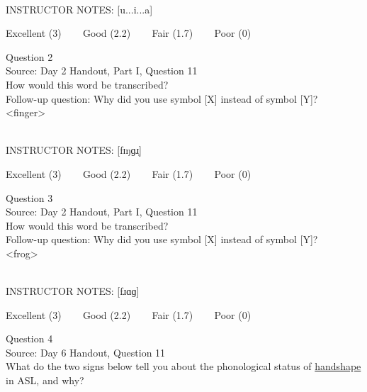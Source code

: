 \documentclass[12pt]{article}
\begin{document}
~\\
INSTRUCTOR NOTES: [u...i...a]


\vfill
Excellent (3) ~~~ Good (2.2) ~~~ Fair (1.7) ~~~ Poor (0)
\newpage

{\large Question 2}\\

Source: Day 2 Handout, Part I, Question 11\\

How would this word be transcribed?\\ Follow-up question: Why did you use symbol [X] instead of symbol [Y]?\\

<finger>


~\\
INSTRUCTOR NOTES: [fɪŋɡɹ̩]


\vfill
Excellent (3) ~~~ Good (2.2) ~~~ Fair (1.7) ~~~ Poor (0)
\newpage

{\large Question 3}\\

Source: Day 2 Handout, Part I, Question 11\\

How would this word be transcribed?\\ Follow-up question: Why did you use symbol [X] instead of symbol [Y]?\\

<frog>


~\\
INSTRUCTOR NOTES: [fɹɑɡ]


\vfill
Excellent (3) ~~~ Good (2.2) ~~~ Fair (1.7) ~~~ Poor (0)
\newpage

{\large Question 4}\\

Source: Day 6 Handout, Question 11\\

What do the two signs below tell you about the phonological status of \underline{handshape} in ASL, and why?\\
\end{document}
